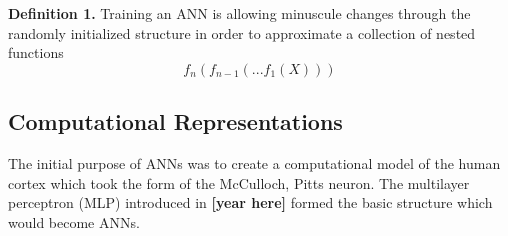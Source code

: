 \textbf{Definition 1.} Training an ANN is allowing minuscule changes through the randomly initialized structure in order to approximate a collection of nested functions $$f_n(f_{n-1}(...f_1(X)))$$ 

\subsection{Computational Representations}
The initial purpose of ANNs was to create a computational model of the human cortex which took the form of the McCulloch, Pitts neuron. The multilayer perceptron (MLP) introduced in \textbf{[year here]} formed the basic structure which would become ANNs. 


